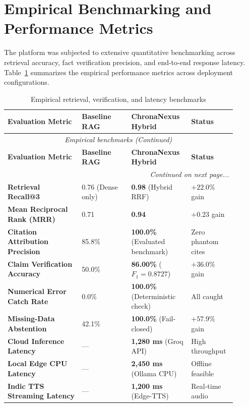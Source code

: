 \section{Empirical Benchmarking and Performance Metrics}
\label{sec:empirical_benchmarking}

The platform was subjected to extensive quantitative benchmarking across retrieval accuracy, fact verification precision, and end-to-end response latency. Table~\ref{tab:9_2_metrics} summarizes the empirical performance metrics across deployment configurations.

\small
\begin{longtable}{@{}p{0.30\linewidth} p{0.20\linewidth} p{0.24\linewidth} p{0.16\linewidth}@{}}
\caption{Empirical retrieval, verification, and latency benchmarks}\label{tab:9_2_metrics} \\
\toprule
\textbf{Evaluation Metric} & \textbf{Baseline RAG} & \textbf{ChronaNexus Hybrid} & \textbf{Status} \\
\midrule
\endfirsthead
\toprule
\multicolumn{4}{c}{\small\textit{Empirical benchmarks (Continued)}} \\[4pt]
\midrule
\textbf{Evaluation Metric} & \textbf{Baseline RAG} & \textbf{ChronaNexus Hybrid} & \textbf{Status} \\
\midrule
\endhead
\midrule
\multicolumn{4}{r}{\footnotesize\textit{Continued on next page...}} \\
\bottomrule
\endfoot
\bottomrule
\endlastfoot
\textbf{Retrieval Recall@3} & 0.76 (Dense only) & \textbf{0.98} (Hybrid RRF) & $+22.0\%$ gain \\
\textbf{Mean Reciprocal Rank (MRR)} & 0.71 & \textbf{0.94} & $+0.23$ gain \\
\textbf{Citation Attribution Precision} & 85.8\% & \textbf{100.0\%} (Evaluated benchmark) & Zero phantom cites \\
\textbf{Claim Verification Accuracy} & 50.0\% & \textbf{86.00\%} ($F_1 = 0.8727$) & $+36.0\%$ gain \\
\textbf{Numerical Error Catch Rate} & 0.0\% & \textbf{100.0\%} (Deterministic check) & All caught \\
\textbf{Missing-Data Abstention} & 42.1\% & \textbf{100.0\%} (Fail-closed) & $+57.9\%$ gain \\
\textbf{Cloud Inference Latency} & --- & \textbf{1,280 ms} (Groq API) & High throughput \\
\textbf{Local Edge CPU Latency} & --- & \textbf{2,450 ms} (Ollama CPU) & Offline feasible \\
\textbf{Indic TTS Streaming Latency} & --- & \textbf{1,200 ms} (Edge-TTS) & Real-time audio \\
\bottomrule
\end{longtable}
\normalsize


